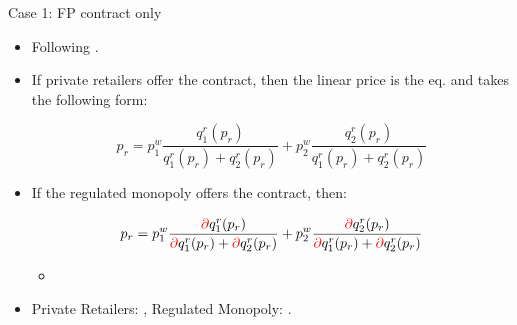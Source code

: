 \documentclass{class}
\begin{document}
\begin{frame}{Case 1: FP contract only}

\begin{itemize}

\item Following \cite{joskow2006retail}. \vfill

\item If private retailers offer the contract, then the linear price is the eq. and takes the following form:

\begin{equation*}
 p_r = p_1^w  \frac{q_1^r(p_r)}{ q_1^r(p_r) + q_2^r(p_r) } + p_2^w \frac{ q_2^r(p_r)}{ q_1^r(p_r) + q_2^r(p_r) }
\end{equation*}

\vfill

\item If the regulated monopoly offers the contract, then: 

\begin{equation*}
 p_r = p_1^w \frac{ \textcolor{red}{\partial} q_1^{r}(p_r)}{ \textcolor{red}{\partial} q_1^{r}(p_r) + \textcolor{red}{\partial} q_2^{r}(p_r) } + p_2^w\frac{ \textcolor{red}{\partial} q_2^{r}(p_r)}{ \textcolor{red}{\partial} q_1^{r}(p_r) + \textcolor{red}{\partial} q_2^{r}(p_r) }
 \end{equation*}

\vfill

\begin{itemize}
    \item  \hyperlink{ramsey_init}{}
\end{itemize}

\vfill

\item Private Retailers: , Regulated Monopoly: . 

\end{itemize}

\end{frame}

\end{document}
